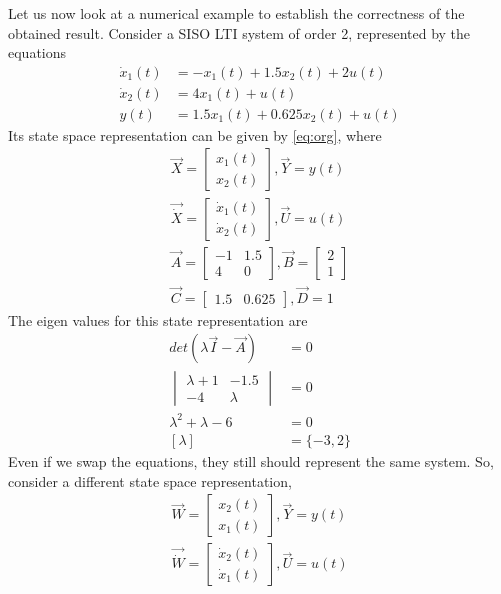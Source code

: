 \documentclass[journal,12pt,twocolumn]{IEEEtran}
\begin{document}
Let us now look at a numerical example to establish the correctness of the obtained result. Consider a SISO LTI system of order 2, represented by the equations
\begin{align}
    \dot x_1(t)&=-x_1(t)+1.5x_2(t)+2u(t)\\
    \dot x_2(t)&=4x_1(t)+u(t)\\
    y(t)&=1.5x_1(t)+0.625x_2(t)+u(t)
\end{align}
Its state space representation can be given by \eqref{eq:org}, where
\begin{align}
    \vec{X}=\begin{bmatrix}
    x_1(t)\\x_2(t)
    \end{bmatrix},\vec{Y}=y(t)\\
    \vec{\dot X}=\begin{bmatrix}
    \dot x_1(t)\\\dot x_2(t)
    \end{bmatrix},\vec{U}=u(t)\\
    \vec{A}=\begin{bmatrix}
    -1 & 1.5\\
    4 & 0
    \end{bmatrix},\vec{B}=\begin{bmatrix}
    2\\
    1
    \end{bmatrix}\\
    \vec{C}=\begin{bmatrix}
    1.5 & 0.625
    \end{bmatrix},\vec{D}=1
\end{align}
The eigen values for this state representation are
\begin{align}
    det(\lambda \vec{I}-\vec{A})&=0\\
    \begin{vmatrix}
    \lambda+1 & -1.5\\
    -4 & \lambda
    \end{vmatrix}&=0\\
    \lambda^2+\lambda-6&=0\\
    [\lambda]&=\{-3,2\}
\end{align}
Even if we swap the equations, they still should represent the same system. So, consider a different state space representation, 
\begin{align}
    \vec{W}=\begin{bmatrix}
    x_2(t)\\x_1(t)
    \end{bmatrix},\vec{Y}=y(t)\\
    \vec{\dot W}=\begin{bmatrix}
    \dot x_2(t)\\\dot x_1(t)
    \end{bmatrix},\vec{U}=u(t)
\end{align}
\end{document}

